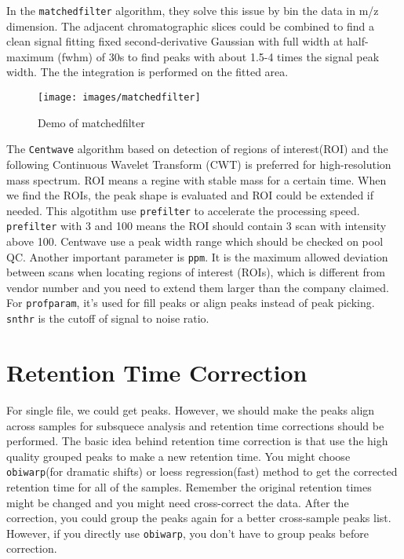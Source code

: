 \documentclass[
]{book}
\begin{document}
In the \texttt{matchedfilter} algorithm\citep{smith2006}, they solve this issue by bin the data in m/z dimension. The adjacent chromatographic slices could be combined to find a clean signal fitting fixed second-derivative Gaussian with full width at half-maximum
(fwhm) of 30s to find peaks with about 1.5-4 times the signal peak width. The the integration is performed on the fitted area.

\begin{figure}
\texttt{[image: images/matchedfilter]} \caption{Demo of matchedfilter}\label{fig:matchedfilter}
\end{figure}

The \texttt{Centwave} algorithm\citep{tautenhahn2008} based on detection of regions of interest(ROI) and the following Continuous Wavelet Transform (CWT) is preferred for high-resolution mass spectrum. ROI means a regine with stable mass for a certain time. When we find the ROIs, the peak shape is evaluated and ROI could be extended if needed. This algotithm use \texttt{prefilter} to accelerate the processing speed. \texttt{prefilter} with 3 and 100 means the ROI should contain 3 scan with intensity above 100. Centwave use a peak width range which should be checked on pool QC. Another important parameter is \texttt{ppm}. It is the maximum allowed deviation between scans when locating regions of interest (ROIs), which is different from vendor number and you need to extend them larger than the company claimed. For \texttt{profparam}, it's used for fill peaks or align peaks instead of peak picking. \texttt{snthr} is the cutoff of signal to noise ratio.

\hypertarget{retention-time-correction}{%
\section{Retention Time Correction}\label{retention-time-correction}}

For single file, we could get peaks. However, we should make the peaks align across samples for subsquece analysis and retention time corrections should be performed. The basic idea behind retention time correction is that use the high quality grouped peaks to make a new retention time. You might choose \texttt{obiwarp}(for dramatic shifts) or loess regression(fast) method to get the corrected retention time for all of the samples. Remember the original retention times might be changed and you might need cross-correct the data. After the correction, you could group the peaks again for a better cross-sample peaks list. However, if you directly use \texttt{obiwarp}, you don't have to group peaks before correction.
\end{document}
